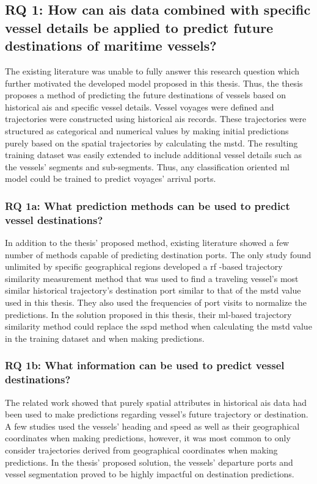 \subsection{RQ 1: How can \acrshort{ais} data combined with specific vessel details be applied to predict future destinations of maritime vessels?}

The existing literature was unable to fully answer this research question which further motivated the developed model proposed in this thesis. Thus, the thesis proposes a method of predicting the future destinations of vessels based on historical \acrshort{ais} and specific vessel details. Vessel voyages were defined and trajectories were constructed using historical \acrshort{ais} records. These trajectories were structured as categorical and numerical values by making initial predictions purely based on the spatial trajectories by calculating the \acrfull{mstd}. The resulting training dataset was easily extended to include additional vessel details such as the vessels' segments and sub-segments. Thus, any classification oriented \acrshort{ml} model could be trained to predict voyages' arrival ports.

\subsubsection{RQ 1a: What prediction methods can be used to predict vessel destinations?}

In addition to the thesis' proposed method, existing literature showed a few number of methods capable of predicting destination ports. The only study found unlimited by specific geographical regions developed a \acrfull{rf} -based trajectory similarity measurement method that was used to find a traveling vessel's most similar historical trajectory's destination port similar to that of the \acrshort{mstd} value used in this thesis. They also used the frequencies of port visits to normalize the predictions. In the solution proposed in this thesis, their \acrshort{ml}-based trajectory similarity method could replace the \acrshort{sspd} method when calculating the \acrshort{mstd} value in the training dataset and when making predictions.

\subsubsection{RQ 1b: What information can be used to predict vessel destinations?}

The related work showed that purely spatial attributes in historical \acrshort{ais} data had been used to make predictions regarding vessel's future trajectory or destination. A few studies used the vessels' heading and speed as well as their geographical coordinates when making predictions, however, it was most common to only consider trajectories derived from geographical coordinates when making predictions. In the thesis' proposed solution, the vessels' departure ports and vessel segmentation proved to be highly impactful on destination predictions.

